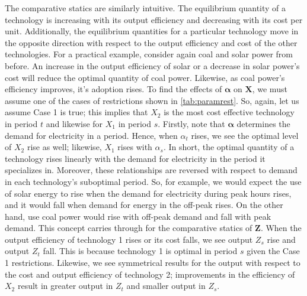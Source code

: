 \documentclass[11pt,a4paper,leqno]{extarticle}
\begin{document}
	
	The comparative statics are similarly intuitive. The equilibrium quantity of a technology is increasing with its output efficiency and decreasing with its cost per unit. Additionally, the equilibrium quantities for a particular technology move in the opposite direction with respect to the output efficiency and cost of the other technologies. For a practical example, consider again coal and solar power from before. An increase in the output efficiency of solar or a decrease in solar power's cost will reduce the optimal quantity of coal power. Likewise, as coal power's efficiency improves, it's adoption rises. To find the effects of $\boldsymbol{\alpha}$ on $\mathbf{X}$, we must assume one of the cases of restrictions shown in  \autoref{tab:paramrest}. So, again, let us assume Case 1 is true; this implies that $X_2$ is the most cost effective technology in period $t$ and likewise for $X_1$ in period $s$. Firstly, note that $\boldsymbol{\alpha}$ determines the demand for electricity in a period. Hence, when $\alpha_t$ rises, we see the optimal level of $X_2$ rise as well; likewise, $X_1$ rises with $\alpha_s$. In short, the optimal quantity of a technology rises linearly with the demand for electricity in the period it specializes in. Moreover, these relationships are reversed with respect to demand in each technology's suboptimal period. So, for example, we would expect the use of solar energy to rise when the demand for electricity during peak hours rises, and it would fall when demand for energy in the off-peak rises. On the other hand, use coal power would rise with off-peak demand and fall with peak demand. This concept carries through for the comparative statics of $\mathbf{Z}$. When the output efficiency of technology 1 rises or its cost falls, we see output $Z_s$ rise and output $Z_t$ fall. This is because technology 1 is optimal in period $s$ given the Case 1 restrictions. Likewise, we see symmetrical results for the output with respect to the cost and output efficiency of technology 2; improvements in the efficiency of $X_2$ result in greater output in $Z_t$ and smaller output in $Z_s$.  
	
\end{document}
